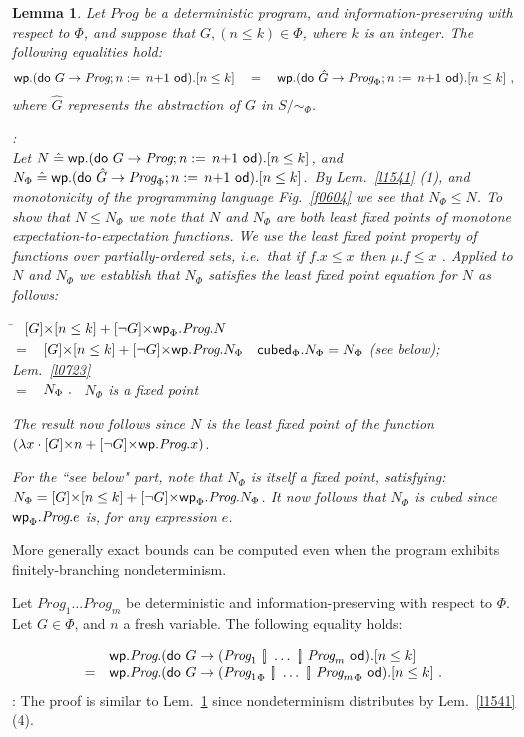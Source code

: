 \documentclass[numbers,copyright,creativecommons]{eptcs}
\newcommand{\figg}[1]{Fig.~\ref{#1}}
\newcommand{\cubed}{\mbox{\sf cubed}}
\newcommand{\Gets}{:=\,}
\newcommand{\Ch}{\ [\!] \ }
\newcommand{\Do}{\mbox{\sf do\ }}
\newcommand{\Od}{\mbox{\sf \ od}}
\newcommand{\Wp}{\mbox{\sf wp}}
\newcommand{\Prog}{\textit{Prog}}
\newcommand{\IE}{\textrm{i.e.}}
\newcommand{\Defs}{\mathrel{\hat{=}}}
\newcommand{\Wide}[1]{~~~#1~~~}
\newtheorem{Lems}{Lemma} \newcommand{\Lem}[1]{Lem.~\ref{#1}}
\newcommand{\Proof}{\noindent{\bf Proof}: \quad}
\newenvironment{Reason}{\begin{tabbing}\hspace{4em}\=\kill}{\end{tabbing}\vspace{-2.5ex}}
\newcommand{\Step}[2]{#1 \> $\begin{array}[t]{ll}#2\end{array}$ \\}
\newcommand{\StepR}[3]{#1 \> $\begin{array}[t]{ll}#3\end{array}$ \` {\RF #2} \\}
\newcommand{\RF}{\small}
\begin{document}
\begin{Lems}\label{l0939}
Let $\Prog$ be a deterministic program, and information-preserving with respect to $\Phi$, and suppose that $G, (n\leq k) \in \Phi$, where $k$ is an integer.
The following equalities hold:
\[
\Wp.(\Do G \rightarrow \Prog; n\Gets n{+}1 \Od).[n\leq k] \Wide{=}  \Wp.(\Do \hat{G} \rightarrow \Prog_\Phi; n\Gets n{+}1 \Od).[n\leq k]~,
\]
where $\hat{G}$ represents the abstraction of $G$ in $S/\sim_\Phi$.

\Proof\\
Let $N \Defs \Wp.(\Do G \rightarrow \Prog; n\Gets n{+}1 \Od).[n\leq k]$, and $\mathord{N_\Phi \Defs  \Wp.(\Do \hat{G} \rightarrow \Prog_\Phi; n\Gets n{+}1 \Od).[n \leq k]}$.\ By \Lem{l1541} (1), and monotonicity of the programming language \figg{f0604} we see that $N_\Phi \leq N$. To show that $N\leq N_\Phi$ we note that $N$ and  $N_\Phi$ are both least fixed points of monotone expectation-to-expectation functions. We use the least fixed point property of functions over partially-ordered sets, \IE\ that if $f.x \leq x$ then $\mu.f \leq x$ \cite{Tarski}. Applied to $N$ and $N_\Phi$ we establish that $N_\Phi$ satisfies the least fixed point equation for $N$ as follows:

\begin{Reason}
\Step{}
{[G]{\times}[n\leq k] + [\neg G]{\times} \Wp_\Phi.\Prog.N}
\StepR{$=$}{$\cubed_\Phi.N_\Phi = N_\Phi$ (see below);  \Lem{l0723}}
{[G]{\times}[n\leq k] + [\neg G]{\times} \Wp.\Prog.N_\Phi}
\StepR{$=$}{$N_\Phi$ is a fixed point}
{N_\Phi~.}
\end{Reason}
The result now follows since $N$ is the least fixed point of the function $(\lambda x \cdot [G]{\times}n + [\neg G]{\times} \Wp.\Prog.x)$.

For the ``see below" part, note that $N_\Phi$ is itself a fixed point, satisfying: $N_\Phi = [G]{\times}[n\leq k] + [\neg G]{\times} \Wp_\Phi.\Prog.N_\Phi$. It now follows that $N_\Phi$ is cubed since  $\Wp_\Phi.\Prog.e$ is, for any expression $e$.
\end{Lems}

More generally exact bounds can be computed even when the program exhibits finitely-branching nondeterminism.

\begin{Corl}\label{c1021}
Let $\Prog_1\dots \Prog_m$ be deterministic and information-preserving with respect to $\Phi$. Let $G \in \Phi$, and $n$ a fresh variable. The following equality holds:

\[
\begin{array}{ll}
&\Wp. \Prog.(\Do G \rightarrow (\Prog_1 \Ch \dots \Ch \Prog_m \Od).[n\leq k]\\
=& \Wp. \Prog. (\Do G \rightarrow ({\Prog_1}_\Phi \Ch \dots \Ch{\Prog_m}_\Phi \Od).[n\leq k]~.\\
\end{array}
\]
\Proof
The proof is similar to \Lem{l0939} since nondeterminism distributes by \Lem{l1541} (4).
\end{Corl}
\end{document}
